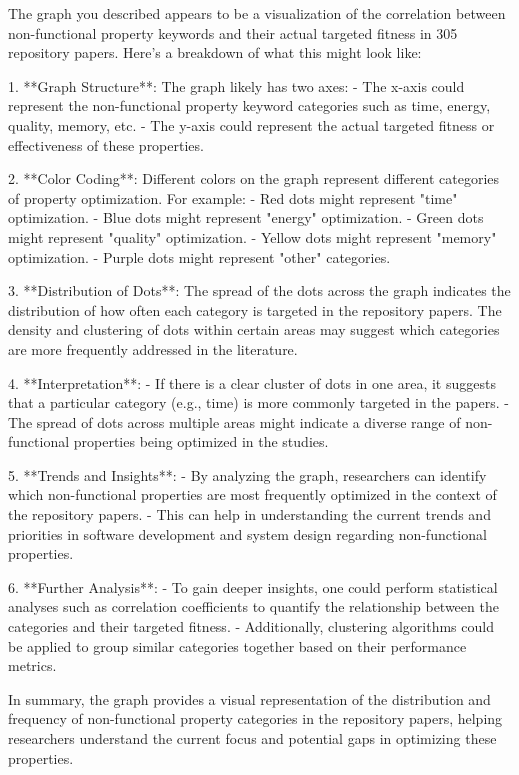 The graph you described appears to be a visualization of the correlation between non-functional property keywords and their actual targeted fitness in 305 repository papers. Here's a breakdown of what this might look like:

1. **Graph Structure**: The graph likely has two axes:
   - The x-axis could represent the non-functional property keyword categories such as time, energy, quality, memory, etc.
   - The y-axis could represent the actual targeted fitness or effectiveness of these properties.

2. **Color Coding**: Different colors on the graph represent different categories of property optimization. For example:
   - Red dots might represent "time" optimization.
   - Blue dots might represent "energy" optimization.
   - Green dots might represent "quality" optimization.
   - Yellow dots might represent "memory" optimization.
   - Purple dots might represent "other" categories.

3. **Distribution of Dots**: The spread of the dots across the graph indicates the distribution of how often each category is targeted in the repository papers. The density and clustering of dots within certain areas may suggest which categories are more frequently addressed in the literature.

4. **Interpretation**:
   - If there is a clear cluster of dots in one area, it suggests that a particular category (e.g., time) is more commonly targeted in the papers.
   - The spread of dots across multiple areas might indicate a diverse range of non-functional properties being optimized in the studies.

5. **Trends and Insights**:
   - By analyzing the graph, researchers can identify which non-functional properties are most frequently optimized in the context of the repository papers.
   - This can help in understanding the current trends and priorities in software development and system design regarding non-functional properties.

6. **Further Analysis**:
   - To gain deeper insights, one could perform statistical analyses such as correlation coefficients to quantify the relationship between the categories and their targeted fitness.
   - Additionally, clustering algorithms could be applied to group similar categories together based on their performance metrics.

In summary, the graph provides a visual representation of the distribution and frequency of non-functional property categories in the repository papers, helping researchers understand the current focus and potential gaps in optimizing these properties.
